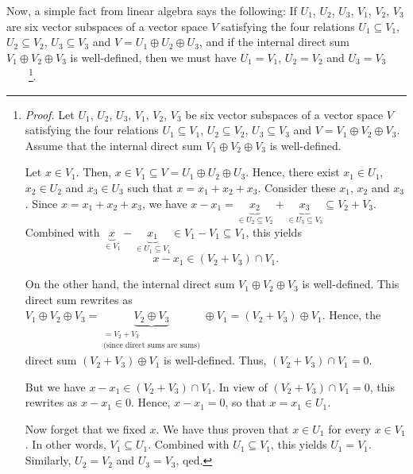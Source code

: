 \documentclass[etingof-lie.tex]{subfiles}
\begin{document}
\begin{verlong}
Now, a simple fact from linear algebra says the following: If $U_{1}$, $U_{2}%
$, $U_{3}$, $V_{1}$, $V_{2}$, $V_{3}$ are six vector subspaces of a vector
space $V$ satisfying the four relations $U_{1}\subseteq V_{1}$, $U_{2}%
\subseteq V_{2}$, $U_{3}\subseteq V_{3}$ and $V=U_{1}\oplus U_{2}\oplus U_{3}%
$, and if the internal direct sum $V_{1}\oplus V_{2}\oplus V_{3}$ is
well-defined, then we must have $U_{1}=V_{1}$, $U_{2}=V_{2}$ and $U_{3}=V_{3}%
$\ \ \ \ \footnote{\textit{Proof.} Let $U_{1}$, $U_{2}$, $U_{3}$, $V_{1}$,
$V_{2}$, $V_{3}$ be six vector subspaces of a vector space $V$ satisfying the
four relations $U_{1}\subseteq V_{1}$, $U_{2}\subseteq V_{2}$, $U_{3}\subseteq
V_{3}$ and $V=V_{1}\oplus V_{2}\oplus V_{3}$. Assume that the internal direct
sum $V_{1}\oplus V_{2}\oplus V_{3}$ is well-defined.
\par
Let $x\in V_{1}$. Then, $x\in V_{1}\subseteq V=U_{1}\oplus U_{2}\oplus U_{3}$.
Hence, there exist $x_{1}\in U_{1}$, $x_{2}\in U_{2}$ and $x_{3}\in U_{3}$
such that $x=x_{1}+x_{2}+x_{3}$. Consider these $x_{1}$, $x_{2}$ and $x_{3}$.
Since $x=x_{1}+x_{2}+x_{3}$, we have $x-x_{1}=\underbrace{x_{2}}_{\in
U_{2}\subseteq V_{2}}+\underbrace{x_{3}}_{\in U_{3}\subseteq V_{3}}\subseteq
V_{2}+V_{3}$. Combined with $\underbrace{x}_{\in V_{1}}-\underbrace{x_{1}%
}_{\in U_{1}\subseteq V_{1}}\in V_{1}-V_{1}\subseteq V_{1}$, this yields
\[
x-x_{1}\in\left(  V_{2}+V_{3}\right)  \cap V_{1}.
\]
\par
On the other hand, the internal direct sum $V_{1}\oplus V_{2}\oplus V_{3}$ is
well-defined. This direct sum rewrites as $V_{1}\oplus V_{2}\oplus
V_{3}=\underbrace{V_{2}\oplus V_{3}}_{\substack{=V_{2}+V_{3}\\\text{(since
direct sums are sums)}}}\oplus V_{1}=\left(  V_{2}+V_{3}\right)  \oplus V_{1}%
$. Hence, the direct sum $\left(  V_{2}+V_{3}\right)  \oplus V_{1}$ is
well-defined. Thus, $\left(  V_{2}+V_{3}\right)  \cap V_{1}=0$.
\par
But we have $x-x_{1}\in\left(  V_{2}+V_{3}\right)  \cap V_{1}$. In view of
$\left(  V_{2}+V_{3}\right)  \cap V_{1}=0$, this rewrites as $x-x_{1}\in0$.
Hence, $x-x_{1}=0$, so that $x=x_{1}\in U_{1}$.
\par
Now forget that we fixed $x$. We have thus proven that $x\in U_{1}$ for every
$x\in V_{1}$. In other words, $V_{1}\subseteq U_{1}$. Combined with
$U_{1}\subseteq V_{1}$, this yields $U_{1}=V_{1}$. Similarly, $U_{2}=V_{2}$
and $U_{3}=V_{3}$, qed.}.
\end{verlong}
\end{document}
